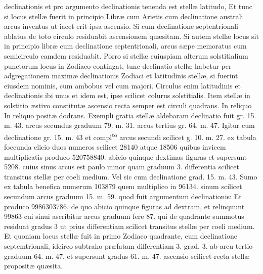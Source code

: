 \documentclass[11pt,a4paper]{article}
\begin{document}
declinationis  et pro argumento declinationis tenenda est stellæ latitudo, Et tunc si locus stellæ fuerit in principio Libræ cum Arietis cum declinatione australi arcus inventus ut iacet erit ipsa ascensio. Si cum declinatione septentrionali ablatus de toto circulo residuabit ascensionem quæsitam. Si autem stellæ locus sit in principio libræ cum declinatione septentrionali, arcus sæpe memoratus cum semicirculo eamdem residuabit. Porro si stellæ cuiuspiam alterum solstitialium punctorum locus in Zodiaco contingat, tunc declinatio stellæ habetur per adgregationem maximæ declinationis Zodiaci et latitudinis stellæ, si fuerint eiusdem nominis, cum ambobus vel cum majori. Circulus enim latitudinis et declinationis ibi unus et idem est, ipse scilicet colurus solstitialis. Item stellæ in solstitio æstivo constitutæ ascensio recta semper est circuli quadrans. In reliquo In reliquo positæ dodrans.
Exempli gratia stellæ aldebaram declinatio fuit gr. 15. m. 43.  arcus secundus graduum 79. m. 31. arcus tertius gr. 64. m. 47. Igitur cum declinatione gr. 15. m. 43 et compl\textsuperscript{to} arcus secundi scilicet g. 10. m. 27. ex tabula foecunda elicio duos numeros scilicet 28140 atque 18506 quibus invicem multiplicatis produco 520758840.  abicio quinque dextimas figuras et supersunt 5208. cuius sinus arcus est paulo minor quam graduum 3. differentia scilicet transitus stellæ per coeli medium. Vel sic cum  declinatione grad. 15. m. 43. Sumo ex tabula benefica numerum 103879 quem multiplico in 96134. sinum scilicet secundum arcus graduum 15. m. 59. quod fuit argumentum declinationis: Et produco 9986303786. de quo abicio quinque figuras ad dextram, et relinquunt 99863 cui sinui ascribitur arcus graduum fere 87. qui de quadrante summotus residuat gradus 3 ut prius differentiam scilicet transitus stellæ per coeli medium. Et quoniam locus stellæ fuit in primo Zodiaco quadrante, cum declinatione septemtrionali, idcirco subtraho præfatam differentiam 3. grad. 3. ab arcu tertio graduum 64. m. 47. et supersunt gradus 61. m. 47. ascensio scilicet recta stellæ propositæ quæsita.
\end{document}
